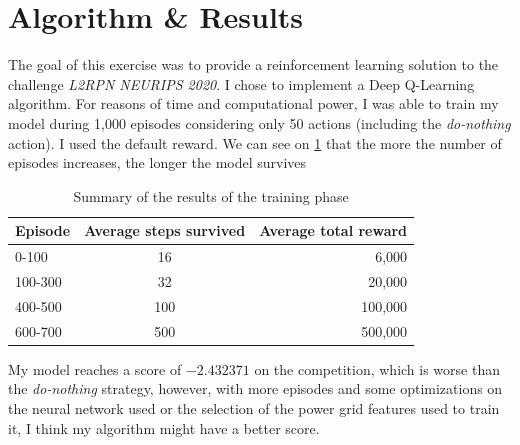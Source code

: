\documentclass[a4paper]{article}
\begin{document}
\section{Algorithm \& Results}
The goal of this exercise was to provide a reinforcement learning solution to the challenge
\textit{L2RPN NEURIPS 2020}\cite{L2RPN}. I chose to implement a Deep Q-Learning algorithm.
For reasons of time and computational power, I was able to train my model during 1,000 episodes
considering only 50 actions (including the \textit{do-nothing} action). I used the default reward.
We can see on \ref{table:results} that the more the number of episodes increases, the longer the model survives
\begin{table}[H]
  \centering
  \begin{tabular}{|l|c|r|}
    \hline
    Episode & Average steps survived & Average total reward \\
    \hline
    0-100 & 16 & 6,000 \\
    \hline
    100-300 & 32 & 20,000 \\
    \hline
    400-500 & 100 & 100,000\\
    \hline
    600-700 & 500 & 500,000\\
    \hline
  \end{tabular}
  \caption{Summary of the results of the training phase}
  \label{table:results}
\end{table}

My model reaches a score of $-2.432371$ on the competition, which is worse than the \textit{do-nothing}
strategy, however, with more episodes and some optimizations on the neural network
used or the selection of the power grid features used to train it,
I think my algorithm might have a better score.
\end{document}
